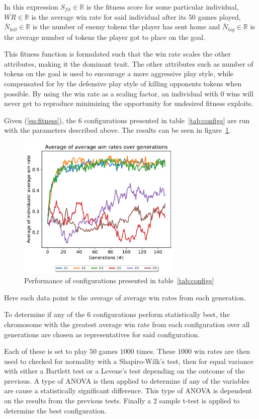 In this expression $S_{fit} \in \mathbb{R}$ is the fitness score for some particular individual,
$\overline{WR} \in \mathbb{R}$ is the average win rate for said individual after its $50$ games played,
$\overline{N}_{kill}\in\mathbb{R}$ is the number of enemy tokens the player has sent home and
$\overline{N}_{tog} \in \mathbb{R}$ is the average number of tokens the player got to place 
on the goal. \par
This fitness function is formulated such that the win rate scales the other attributes,
making it the dominant trait. The other attributes such as number of tokens on the goal is 
used to encourage a more aggressive play style, while compensated for by the defensive play 
style of killing opponents tokens when possible. By using the win rate as a scaling factor,
an individual with 0 wins will never get to reproduce minimizing the opportunity for undesired fitness exploits. \par
Given (\ref{eq:fitness}), the 6 configurations presented in table~\ref{tab:configs} are
run with the parameters described above. The results can be seen in 
figure~\ref{fig:configs_tested}.
\begin{figure}[h]
	\begin{center}
		\includegraphics[width=0.7\textwidth]{fig/config_plot.pdf}
	\end{center}
	\caption{Performance of configurations presented in table~\ref{tab:configs}}
	\label{fig:configs_tested}
\end{figure}
Here each data point is the average of average win rates from each 
generation.\par 
To determine if any of the 6 configurations perform statistically best, the 
chromosome with the greatest average win rate from each configuration over all generations are chosen 
as representatives for said configuration. \par
Each of these is set to play $50$ games $1000$ times. These $1000$ win rates are then used to
checked for normality with a Shapiro-Wilk's test, then for equal variance with either a Bartlett
test or a Levene's test depending on the outcome of the previous. A type of ANOVA is then applied
to determine if any of the variables are cause a statistically significant difference. 
This type of ANOVA is dependent on the results from the previous tests.
Finally a 2 sample t-test is applied to determine the best configuration.

